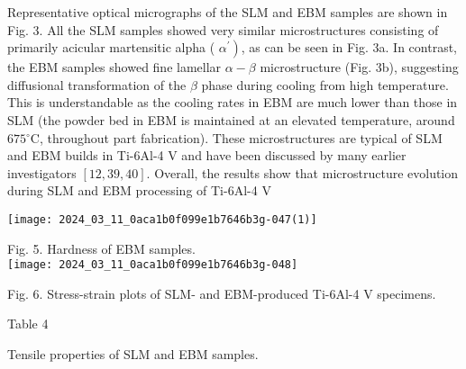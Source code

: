 \documentclass[10pt]{article}
\begin{document}
Representative optical micrographs of the SLM and EBM samples are shown in Fig. 3. All the SLM samples showed very similar microstructures consisting of primarily acicular martensitic alpha ( $\left.\alpha^{\prime}\right)$, as can be seen in Fig. 3a. In contrast, the EBM samples showed fine lamellar $\alpha-\beta$ microstructure (Fig. 3b), suggesting diffusional transformation of the $\beta$ phase during cooling from high temperature. This is understandable as the cooling rates in EBM are much lower than those in SLM (the powder bed in EBM is maintained at an elevated temperature, around $675{ }^{\circ} \mathrm{C}$, throughout part fabrication). These microstructures are typical of SLM and EBM builds in Ti-6Al-4 V and have been discussed by many earlier investigators $[12,39,40]$. Overall, the results show that microstructure evolution during SLM and EBM processing of Ti-6Al-4 V

\begin{center}
\texttt{[image: 2024\_03\_11\_0aca1b0f099e1b7646b3g-047(1)]}
\end{center}

Fig. 5. Hardness of EBM samples.\\
\texttt{[image: 2024\_03\_11\_0aca1b0f099e1b7646b3g-048]}

Fig. 6. Stress-strain plots of SLM- and EBM-produced Ti-6Al-4 V specimens.

Table 4

Tensile properties of SLM and EBM samples.
\end{document}
